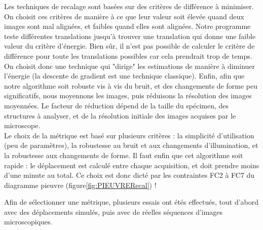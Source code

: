 Les techniques de recalage sont basées sur des critères de différence à minimiser.
On choisit ces critères de manière à ce que leur valeur soit élevée quand deux images sont mal alignées,
et faibles quand elles sont alignées. Notre programme teste différentes translations jusqu'à trouver une translation
qui donne une faible valeur du critère d'énergie.
Bien sûr, il n'est pas possible de calculer le critère de différence pour toute les translations possibles car cela prendrait trop de temps.
On choisit donc une technique qui "dirige" les estimations de manière à diminuer l'énergie
(la descente de gradient est une technique classique).
Enfin, afin que notre algorithme soit robuste vis à vis du bruit, et des changements de forme peu significatifs,
nous moyennons les images, puis réduisons la résolution des images moyennées.
Le facteur de réduction dépend de la taille du spécimen, des structures à analyser,
et de la résolution initiale des images acquises par le microscope.
\\
Le choix de la métrique est basé sur plusieurs critères : la simplicité d'utilisation (peu de paramètres),
la robustesse au bruit et aux changements d'illumination, et la robustesse aux changements de forme. Il faut enfin que cet algorithme soit rapide : le déplacement est calculé entre chaque acquisition, et doit prendre moins d'une minute au total. Ce choix est donc dicté par les contraintes FC2 à FC7 du diagramme pieuvre (figure\ref{fig:PIEUVRERecal}) !

Afin de sélectionner une métrique, plusieurs essais ont étés effectués, tout d'abord avec des déplacements simulés,
puis avec de réelles séquences d'images microscopiques.

